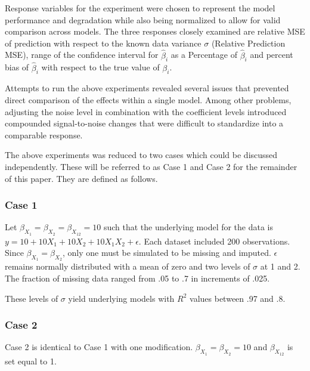\documentclass[../../paper.tex]{subfiles}
\begin{document}
Response variables for the experiment were chosen to represent the model performance
and degradation while also being normalized to allow for valid comparison across
models. The three responses closely examined are relative MSE of prediction
with respect to the known data variance $\sigma$ (Relative Prediction MSE), range of the confidence interval for $\hat{\beta}_{i}$ as a Percentage of $\hat{\beta}_{i}$
and percent bias of $\hat{\beta}_{i}$ with respect to the true value of $\beta_{i}$.

Attempts to run the above experiments revealed several issues that prevented direct comparison of the effects within a single model. Among other problems, adjusting the noise level in combination with the coefficient levels introduced compounded signal-to-noise changes that were difficult to standardize into a comparable response.

The above experiments was reduced to two cases which could be discussed independently.
These will be referred to as Case 1 and Case 2 for the remainder of this paper.
They are defined as follows.

\subsubsection{Case 1}
Let $\beta_{ X_{1}} = \beta_{ X_{2}} = \beta_{ X_{12}} = 10$ such that the underlying model for the data is $y = 10 + 10X_{1} + 10X_{2} + 10X_{1}X_{2} + \epsilon $.
Each dataset included 200 observations.
Since $\beta_{ X_{1}} = \beta_{ X_{2}}$, only one must be simulated to be missing and imputed.
$\epsilon $ remains normally distributed with a mean of zero and two levels of $\sigma$ at 1 and 2. The fraction of missing data ranged from .05 to .7 in increments of .025.

These levels of $\sigma$ yield underlying models with $R^2$ values between .97 and .8.

\subsubsection{Case 2}

Case 2 is identical to Case 1 with one modification. $\beta_{ X_{1}} = \beta_{ X_{2}} = 10$ and $\beta_{ X_{12}}$ is set equal to 1.


\end{document}
